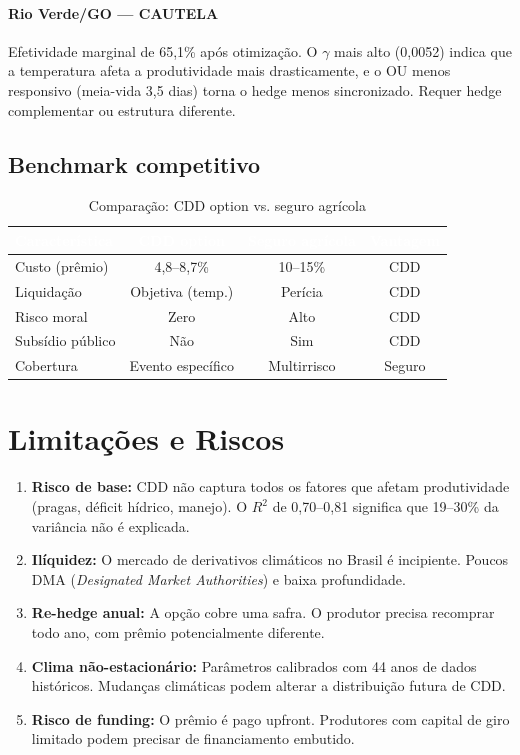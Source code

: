 \documentclass[11pt,a4paper]{article}
\newcommand{\destaque}[1]{\textcolor{wolf_blue}{\textbf{#1}}}
\begin{document}
\paragraph{Rio Verde/GO --- \destaque{CAUTELA}}
Efetividade marginal de 65,1\% após otimização. O $\gamma$ mais alto (0,0052)
indica que a temperatura afeta a produtividade mais drasticamente, e o OU
menos responsivo (meia-vida 3,5 dias) torna o hedge menos sincronizado.
Requer hedge complementar ou estrutura diferente.

\subsection*{Benchmark competitivo}

\begin{table}[htbp]
\centering
\caption{Comparação: CDD option vs. seguro agrícola}
\label{tab:benchmark}
\small
\begin{tabular}{lccc}
\toprule
\rowcolor{wolf_blue}\textcolor{white}{\textbf{Característica}} &
\textcolor{white}{\textbf{CDD option}} &
\textcolor{white}{\textbf{Seguro agrícola}} &
\textcolor{white}{\textbf{Vantagem}} \\
\midrule
Custo (prêmio)   & 4,8--8,7\% & 10--15\% & CDD \\
Liquidação       & Objetiva (temp.) & Perícia & CDD \\
Risco moral      & Zero & Alto & CDD \\
Subsídio público & Não & Sim & CDD \\
Cobertura        & Evento específico & Multirrisco & Seguro \\
\bottomrule
\end{tabular}
\end{table}


\section{Limitações e Riscos}

\begin{enumerate}
  \item \destaque{Risco de base:} CDD não captura todos os fatores que afetam
  produtividade (pragas, déficit hídrico, manejo). O $R^2$ de 0,70--0,81
  significa que 19--30\% da variância não é explicada.
  \item \destaque{Ilíquidez:} O mercado de derivativos climáticos no Brasil é
  incipiente. Poucos DMA (\emph{Designated Market Authorities}) e baixa
  profundidade.
  \item \destaque{Re-hedge anual:} A opção cobre uma safra. O produtor precisa
  recomprar todo ano, com prêmio potencialmente diferente.
  \item \destaque{Clima não-estacionário:} Parâmetros calibrados com 44 anos de
  dados históricos. Mudanças climáticas podem alterar a distribuição futura
  de CDD\@.
  \item \destaque{Risco de funding:} O prêmio é pago upfront. Produtores com
  capital de giro limitado podem precisar de financiamento embutido.
\end{enumerate}
\end{document}
